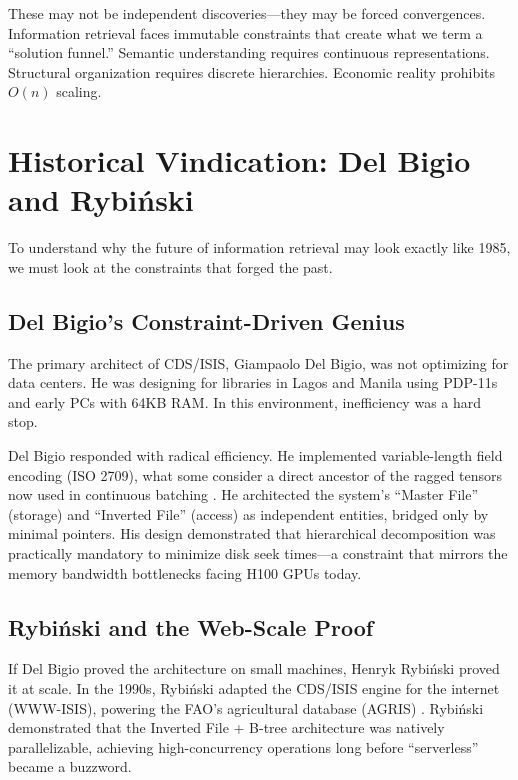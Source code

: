\documentclass[manuscript,screen,nonacm]{acmart}
\begin{document}
These may not be independent discoveries---they may be forced convergences. Information retrieval faces immutable constraints that create what we term a ``solution funnel.'' Semantic understanding requires continuous representations. Structural organization requires discrete hierarchies. Economic reality prohibits $O(n)$ scaling.

\section{Historical Vindication: Del Bigio and Rybi\'{n}ski}

To understand why the future of information retrieval may look exactly like 1985, we must look at the constraints that forged the past.

\subsection{Del Bigio's Constraint-Driven Genius}

The primary architect of CDS/ISIS, Giampaolo Del Bigio, was not optimizing for data centers. He was designing for libraries in Lagos and Manila using PDP-11s and early PCs with 64KB RAM. In this environment, inefficiency was a hard stop.

Del Bigio responded with radical efficiency. He implemented variable-length field encoding (ISO 2709), what some consider a direct ancestor of the ragged tensors now used in continuous batching \cite{iso2709}. He architected the system's ``Master File'' (storage) and ``Inverted File'' (access) as independent entities, bridged only by minimal pointers. His design demonstrated that hierarchical decomposition was practically mandatory to minimize disk seek times---a constraint that mirrors the memory bandwidth bottlenecks facing H100 GPUs today.

\subsection{Rybi\'{n}ski and the Web-Scale Proof}

If Del Bigio proved the architecture on small machines, Henryk Rybi\'{n}ski proved it at scale. In the 1990s, Rybi\'{n}ski adapted the CDS/ISIS engine for the internet (WWW-ISIS), powering the FAO's agricultural database (AGRIS) \cite{rybinski1999}. Rybi\'{n}ski demonstrated that the Inverted File + B-tree architecture was natively parallelizable, achieving high-concurrency operations long before ``serverless'' became a buzzword.
\end{document}
